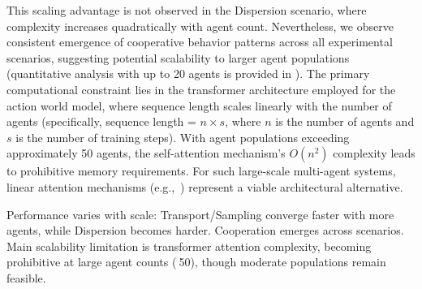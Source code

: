 This scaling advantage is not observed in the Dispersion scenario, where complexity increases quadratically with agent count. Nevertheless, we observe consistent emergence of cooperative behavior patterns across all experimental scenarios, suggesting potential scalability to larger agent populations (quantitative analysis with up to 20 agents is provided in ). The primary computational constraint lies in the transformer architecture employed for the action world model, where sequence length scales linearly with the number of agents (specifically, sequence length = $n \times s$, where $n$ is the number of agents and $s$ is the number of training steps). With agent populations exceeding approximately 50 agents, the self-attention mechanism's $O(n^2)$ complexity leads to prohibitive memory requirements. For such large-scale multi-agent systems, linear attention mechanisms (e.g.,~\cite{Beltagy20}) represent a viable architectural alternative.

\begin{replybox}
Performance varies with scale: Transport/Sampling converge faster with more agents, while Dispersion becomes harder. Cooperation emerges across scenarios. Main scalability limitation is transformer attention complexity, becoming prohibitive at large agent counts ($~$50), though moderate populations remain feasible.
\end{replybox}